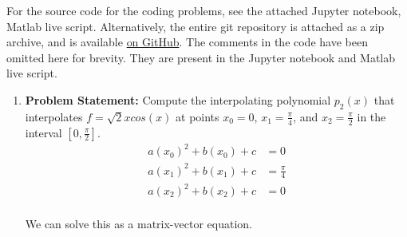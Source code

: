 \documentclass[12pt,twoside]{amsart}
\begin{document}
\thispagestyle{fancy}
\pagestyle{fancy}
\fancyhf{}

For the source code for the coding problems, see the attached Jupyter notebook, Matlab live script. Alternatively, the entire git repository  is attached as a zip archive, and is available \href{https://github.com/blackHat-Magic/math-131-HW3}{on GitHub}. The comments in the code have been omitted here for brevity. They are present in the Jupyter notebook and Matlab live script.

\begin{enumerate}
    \item \textbf{Problem Statement:} Compute the interpolating polynomial $p_2(x)$ that interpolates $f = \sqrt{2}xcos(x)$ at points $x_0 = 0$, $x_1 = \frac{\pi}{4}$, and $x_2 = \frac{\pi}{2}$ in the interval $[0, \frac{\pi}{2}]$.
    \begin{align*}
    a(x_0)^2 + b(x_0) + c & = 0 \\
    a(x_1)^2 + b(x_1) + c & = \frac{\pi}{4} \\
    a(x_2)^2 + b(x_2) + c & = 0 \\
    \end{align*}

    We can solve this as a matrix-vector equation.


\end{enumerate}
\end{document}
